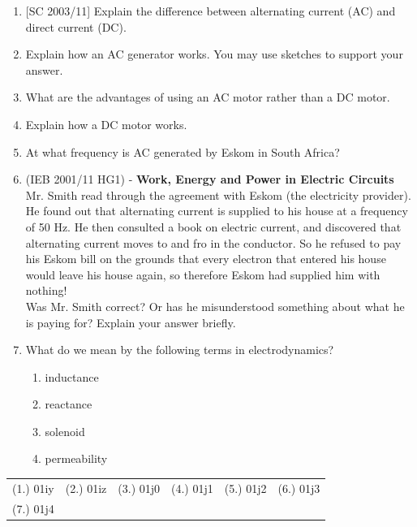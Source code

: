 \begin{eocexercises}{}
\begin{enumerate}
\item{[SC 2003/11] Explain the difference between alternating current (AC) and direct current (DC).}

\item Explain how an AC generator works. You may use sketches to support your answer.

\item What are the advantages of using an AC motor rather than a DC motor.

\item Explain how a DC motor works.
 
\item At what frequency is AC generated by Eskom in South Africa?

\item (IEB 2001/11 HG1) - \textbf{Work, Energy and Power in Electric Circuits}\\
Mr. Smith read through the agreement with Eskom (the electricity provider). He found out that alternating current is supplied to his house at a frequency of 50 Hz. He then consulted a book on electric current, and discovered that alternating current moves to and fro in the conductor. So he refused to pay his Eskom bill on the grounds that every electron that entered his house would leave his house again, so therefore Eskom had supplied him with nothing!\\
 
Was Mr. Smith correct? Or has he misunderstood something about what he is paying for? Explain your answer briefly.
 

\item What do we mean by the following terms in electrodynamics?
\begin{enumerate}
\item inductance
\item reactance
\item solenoid
\item permeability

\end{enumerate}

\end{enumerate}


\par \practiceinfo
\par \begin{tabular}[h]{cccccc}
(1.)	01iy	&
(2.)	01iz	&
(3.)	01j0	&
(4.)	01j1	&
(5.)	01j2	&
(6.)	01j3	\\ %
(7.)	01j4	&
\end{tabular}
\end{eocexercises}





\setlength{\parskip}{2ex}

